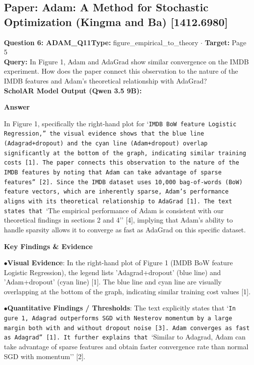 \documentclass[10pt,a4paper]{article}
\begin{document}
\subsection{Paper: Adam: A Method for Stochastic Optimization (Kingma and Ba) [1412.6980]}
\vspace{-4pt}
\begin{tcolorbox}[questionbox]
{\noindent\bfseries\large\color{navy} Question 6: ADAM\_Q11}\hfill {\footnotesize\color{darkteal}\textbf{Type:} figure\_empirical\_to\_theory $\cdot$ \textbf{Target:} Page 5}\\[4pt]
{\noindent\bfseries\color{accentblue} Query: } In Figure 1, Adam and AdaGrad show similar convergence on the IMDB experiment. How does the paper connect this observation to the nature of the IMDB features and Adam's theoretical relationship with AdaGrad?\\[6pt]
{\noindent\bfseries\color{navy} ScholAR Model Output (Qwen 3.5 9B):}\\[2pt]
{\small \noindent \textbf{Answer}\par\vspace{3pt}In Figure 1, specifically the right-hand plot for `\texttt{IMDB BoW feature Logistic Regression,'' the visual evidence shows that the blue line (Adagrad+dropout) and the cyan line (Adam+dropout) overlap significantly at the bottom of the graph, indicating similar training costs [1]. The paper connects this observation to the nature of the IMDB features by noting that Adam can }\texttt{take advantage of sparse features'' [2]. Since the IMDB dataset uses 10,000 bag-of-words (BoW) feature vectors, which are inherently sparse, Adam's performance aligns with its theoretical relationship to AdaGrad [1]. The text states that }`The empirical performance of Adam is consistent with our theoretical findings in sections 2 and 4'' [4], implying that Adam's ability to handle sparsity allows it to converge as fast as AdaGrad on this specific dataset.\par\vspace{3pt}\noindent \textbf{Key Findings \& Evidence}\par\vspace{3pt}\noindent\hspace*{8pt}$\bullet$\hspace*{4pt}\textbf{Visual Evidence}: In the right-hand plot of Figure 1 (IMDB BoW feature Logistic Regression), the legend lists 'Adagrad+dropout' (blue line) and 'Adam+dropout' (cyan line) [1]. The blue line and cyan line are visually overlapping at the bottom of the graph, indicating similar training cost values [1].\par\vspace{3pt}\noindent\hspace*{8pt}$\bullet$\hspace*{4pt}\textbf{Quantitative Findings / Thresholds}: The text explicitly states that `\texttt{In  gure 1, Adagrad outperforms SGD with Nesterov momentum by a large margin both with and without dropout noise [3]. Adam converges as fast as Adagrad'' [1]. It further explains that }`Similar to Adagrad, Adam can take advantage of sparse features and obtain faster convergence rate than normal SGD with momentum'' [2].}\\[6pt]

\end{tcolorbox}
\end{document}
